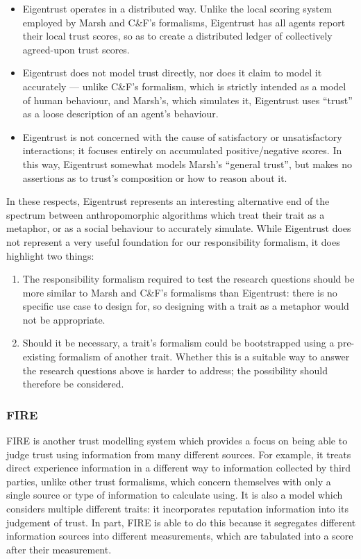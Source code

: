 \begin{itemize}
    \item Eigentrust operates in a distributed way. Unlike the local scoring system employed by Marsh and C\&F's formalisms, Eigentrust has all agents report their local trust scores, so as to create a distributed ledger of collectively agreed-upon trust scores.
    \item Eigentrust does not model trust directly, nor does it claim to model it accurately --- unlike C\&F's formalism, which is strictly intended as a model of human behaviour, and Marsh's, which simulates it, Eigentrust uses ``trust'' as a loose description of an agent's behaviour.
    \item Eigentrust is not concerned with the cause of satisfactory or unsatisfactory interactions; it focuses entirely on accumulated positive/negative scores. In this way, Eigentrust somewhat models Marsh's ``general trust'', but makes no assertions as to trust's composition or how to reason about it.
\end{itemize}

In these respects, Eigentrust represents an interesting alternative end of the spectrum between anthropomorphic algorithms which treat their trait as a metaphor, or as a social behaviour to accurately simulate. While Eigentrust does not represent a very useful foundation for our responsibility formalism, it does highlight two things:

\begin{enumerate}
    \item The responsibility formalism required to test the research questions should be more similar to Marsh and C\&F's formalisms than Eigentrust: there is no specific use case to design for, so designing with a trait as a metaphor would not be appropriate.
    \item Should it be necessary, a trait's formalism could be bootstrapped using a pre-existing formalism of another trait. Whether this is a suitable way to answer the research questions above is harder to address; the possibility should therefore be considered.
\end{enumerate}

\subsubsection{FIRE}
FIRE\cite{huynh2004fire} is another trust modelling system which provides a focus on being able to judge trust using information from many different sources. For example, it treats direct experience  information in a different way to information collected by third parties, unlike other trust formalisms, which concern themselves with only a single source or type of information to calculate using. It is also a model which considers multiple different traits: it incorporates reputation information into its judgement of trust. In part, FIRE is able to do this because it segregates different information sources into different measurements, which are tabulated into a score after their measurement.\par

